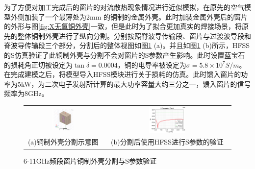 \documentclass[master]{thesis-uestc}
\begin{document}
为了方便对加工完成后的窗片的对流散热现象情况进行近似模拟，在原先的空气模型外侧加装了一个最薄处为2mm 的铜制的金属外壳。此时加装金属外壳后的窗片的外形与图\ref{fig:X无氧铜外壳}一致，但是此时为了拟合更加真实的焊接场景，将原先的整体铜制外壳进行了纵向分割。分别按照脊波导传输段、窗片与过渡波导段和脊波导传输段三个部分，分割后的整体视图如图\ref{fig:X频段铜制外壳分割后} (a)。并且如图\ref{fig:X频段铜制外壳分割后} (b)所示，HFSS的S仿真验证了此铜制外壳与分割不会对窗片的S参数产生影响。此时设置蓝宝石的损耗角正切被设定为\(\tan \delta = 0.0004\)，铜的电导率被设定为\(\sigma = 5.8 \times 10^7 S/m\)。在完成建模之后，将模型导入HFSS模块进行关于损耗的仿真。此时馈入窗片的功率为5kW，为二次电子发射所计算的最大功率容量大约三分之一，馈入窗片的信号频率为8GHz。
\begin{figure}[!htb]
    \small
    \centering
    \begin{tabular}{@{\ }c@{\ }c}
        \includegraphics[width=0.3\textwidth]{pic/chapter3/铜制外壳分割后.png} & 
        \hspace{5pt}
        \includegraphics[width=0.3\textwidth]{pic/chapter3/分割后的S参数.png}     \\
        \mbox{\small (a)铜制外壳分割示意图}                                                                               & 
        \mbox{\small (b)分割后使用HFSS进行S参数的验证}                                                                                  \\
    \end{tabular}
    \caption{6-11GHz频段窗片铜制外壳分割与S参数验证}
    \label{fig:X频段铜制外壳分割后}
\end{figure}
\end{document}
